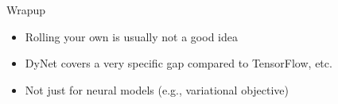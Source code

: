 \documentclass[compress]{beamer}
\begin{document}
\begin{frame}{Wrapup}

  \begin{itemize}
    \item Rolling your own is usually not a good idea
    \item DyNet covers a very specific gap compared to TensorFlow, etc.
    \item Not just for neural models (e.g., variational objective)
  \end{itemize}

\end{frame}
\end{document}
